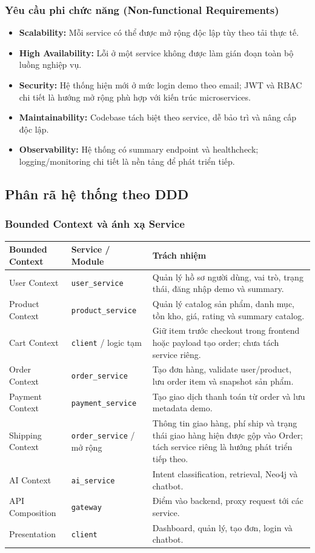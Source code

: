 \documentclass[12pt,a4paper]{article}
\begin{document}
\subsubsection{Yêu cầu phi chức năng (Non-functional Requirements)}
\begin{itemize}
  \item \textbf{Scalability:} Mỗi service có thể được mở rộng độc lập tùy theo tải thực tế.
  \item \textbf{High Availability:} Lỗi ở một service không được làm gián đoạn toàn bộ luồng nghiệp vụ.
  \item \textbf{Security:} Hệ thống hiện mới ở mức login demo theo email; JWT và RBAC chi tiết là hướng mở rộng phù hợp với kiến trúc microservices.
  \item \textbf{Maintainability:} Codebase tách biệt theo service, dễ bảo trì và nâng cấp độc lập.
  \item \textbf{Observability:} Hệ thống có summary endpoint và healthcheck; logging/monitoring chi tiết là nền tảng để phát triển tiếp.
\end{itemize}

\subsection{Phân rã hệ thống theo DDD}
\subsubsection{Bounded Context và ánh xạ Service}
\begin{longtable}{p{3.4cm}p{3.8cm}p{6.2cm}}
\toprule
\textbf{Bounded Context} & \textbf{Service / Module} & \textbf{Trách nhiệm} \\
\midrule
User Context & \texttt{user\_service} & Quản lý hồ sơ người dùng, vai trò, trạng thái, đăng nhập demo và summary. \\
Product Context & \texttt{product\_service} & Quản lý catalog sản phẩm, danh mục, tồn kho, giá, rating và summary catalog. \\
Cart Context & \texttt{client} / logic tạm & Giữ item trước checkout trong frontend hoặc payload tạo order; chưa tách service riêng. \\
Order Context & \texttt{order\_service} & Tạo đơn hàng, validate user/product, lưu order item và snapshot sản phẩm. \\
Payment Context & \texttt{payment\_service} & Tạo giao dịch thanh toán từ order và lưu metadata demo. \\
Shipping Context & \texttt{order\_service} / mở rộng & Thông tin giao hàng, phí ship và trạng thái giao hàng hiện được gộp vào Order; tách service riêng là hướng phát triển tiếp theo. \\
AI Context & \texttt{ai\_service} & Intent classification, retrieval, Neo4j và chatbot. \\
API Composition & \texttt{gateway} & Điểm vào backend, proxy request tới các service. \\
Presentation & \texttt{client} & Dashboard, quản lý, tạo đơn, login và chatbot. \\
\bottomrule
\end{longtable}
\end{document}
